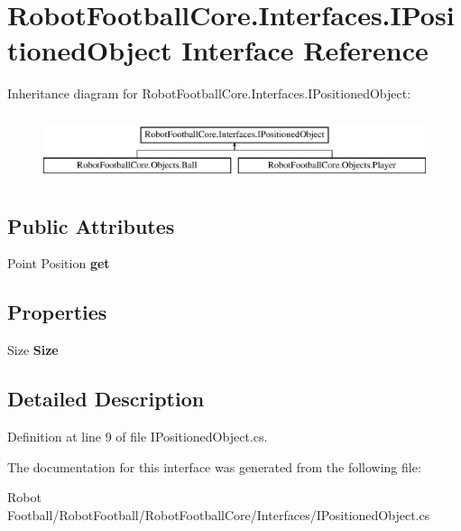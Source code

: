 \hypertarget{interface_robot_football_core_1_1_interfaces_1_1_i_positioned_object}{\section{Robot\-Football\-Core.\-Interfaces.\-I\-Positioned\-Object Interface Reference}
\label{interface_robot_football_core_1_1_interfaces_1_1_i_positioned_object}
}
Inheritance diagram for Robot\-Football\-Core.\-Interfaces.\-I\-Positioned\-Object\-:\begin{figure}[H]
\begin{center}
\leavevmode
\includegraphics[height=1.951219cm]{interface_robot_football_core_1_1_interfaces_1_1_i_positioned_object}
\end{center}
\end{figure}
\subsection*{Public Attributes}
\begin{DoxyCompactItemize}
\item 
\hypertarget{interface_robot_football_core_1_1_interfaces_1_1_i_positioned_object_aa7b037bce1870666b1065da95cffe162}{Point Position {\bfseries get}}\label{interface_robot_football_core_1_1_interfaces_1_1_i_positioned_object_aa7b037bce1870666b1065da95cffe162}

\end{DoxyCompactItemize}
\subsection*{Properties}
\begin{DoxyCompactItemize}
\item 
\hypertarget{interface_robot_football_core_1_1_interfaces_1_1_i_positioned_object_a2e19e086c92bf401f51ef0042634fb96}{Size {\bfseries Size}}\label{interface_robot_football_core_1_1_interfaces_1_1_i_positioned_object_a2e19e086c92bf401f51ef0042634fb96}

\end{DoxyCompactItemize}


\subsection{Detailed Description}


Definition at line 9 of file I\-Positioned\-Object.\-cs.



The documentation for this interface was generated from the following file\-:\begin{DoxyCompactItemize}
\item 
Robot Football/\-Robot\-Football/\-Robot\-Football\-Core/\-Interfaces/I\-Positioned\-Object.\-cs\end{DoxyCompactItemize}
